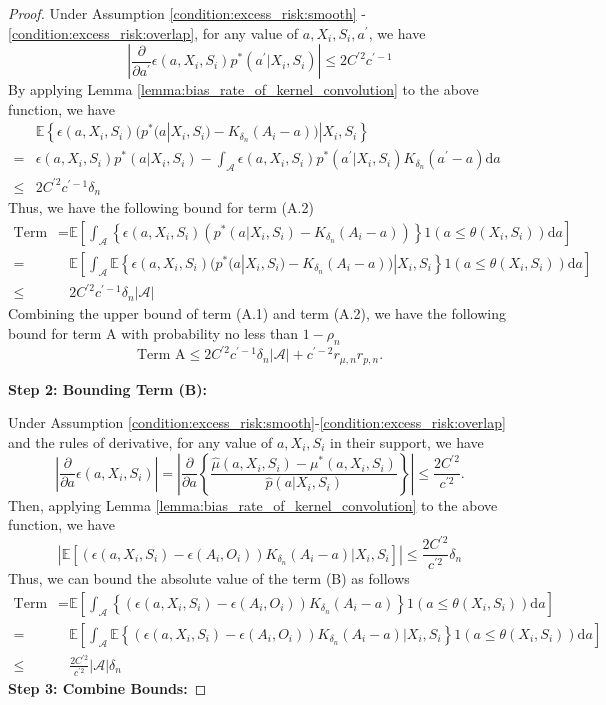 \documentclass[12pt]{article}
\newcommand{\E}{\mathbb{E}}
\begin{document}
\begin{proof}
\noindent Under Assumption \ref{condition:excess_risk:smooth} - \ref{condition:excess_risk:overlap}, for any value of $a,X_i,S_i,a^\prime$, we have 
$$\left|\frac{\partial}{\partial a^\prime}\epsilon(a,X_i,S_i)p^*(a^\prime|X_i,S_i)\right|\leq2C^{\prime2}c^{\prime-1}$$
By applying Lemma \ref{lemma:bias_rate_of_kernel_convolution} to the above function, we have 
\begin{align*}
    &\E\left\{ \epsilon(a,X_i,S_i)(p^*(a|X_i,S_i) - K_{\delta_n}(A_i-a))|X_i,S_i\right\}\\
    = & \epsilon(a,X_i,S_i)p^*(a|X_i,S_i) - \int_\mathcal{A}\epsilon(a,X_i,S_i)p^*(a^\prime|X_i,S_i)K_{\delta_n}(a^\prime - a)\mathrm{d}a\\
    \leq &2C^{\prime2}c^{\prime-1}\delta_n&
\end{align*}
Thus, we have the following bound for term (A.2)
\begin{align*}
    \text{Term (A.2)} = & \E\left[\int_{\mathcal{A}} \left\{ \epsilon(a,X_i,S_i)(p^*(a|X_i,S_i) - K_{\delta_n}(A_i-a))\right\}1(a\leq \theta(X_i,S_i))\mathrm{d}a\right]\\
    = & \E\left[\int_{\mathcal{A}} \E\left\{ \epsilon(a,X_i,S_i)(p^*(a|X_i,S_i) - K_{\delta_n}(A_i-a))|X_i,S_i\right\}1(a\leq \theta(X_i,S_i))\mathrm{d}a\right]\\
    \leq & 2C^{\prime2}c^{\prime-1}\delta_n|\mathcal{A}|
\end{align*}
Combining the upper bound of term (A.1) and term (A.2), we have the following bound for term A with probability no less than $1-\rho_n$
$$\text{Term A}\leq 2C^{\prime2}c^{\prime-1}\delta_n|\mathcal{A}| + c^{\prime-2}r_{\mu,n}r_{p,n}.$$


\noindent\textbf{Step 2: Bounding Term (B):}

\noindent Under Assumption \ref{condition:excess_risk:smooth}-\ref{condition:excess_risk:overlap} and the rules of derivative, for any value of $a,X_i,S_i$ in their support, we have 
$$ \left|\frac{\partial}{\partial a}\epsilon(a,X_i,S_i)\right|= \left|\frac{\partial}{\partial a}\left\{\frac{\widehat\mu(a,X_i,S_i) - \mu^*(a,X_i,S_i)}{\widehat p(a|X_i,S_i)}\right\}\right|\leq \frac{2C^{\prime2}}{c^{\prime2}}.$$
Then, applying Lemma \ref{lemma:bias_rate_of_kernel_convolution} to the above function, we have
$$\left|\E\left[ (\epsilon(a,X_i,S_i) - \epsilon(A_i,O_i)) K_{\delta_n}(A_i-a) \bigg| X_i,S_i\right] \right|\leq \frac{2C^{\prime2}}{c^{\prime2}}{\delta_n}$$
Thus, we can bound the absolute value of the term (B) as follows
\begin{align*}
    \text{Term (B)} =&\E\left[\int_{\mathcal{A}} \left\{(\epsilon(a,X_i,S_i) - \epsilon(A_i,O_i)) K_{\delta_n}(A_i-a)\right\}1(a\leq \theta(X_i,S_i))\mathrm{d}a\right]\\
    = & \E\left[\int_{\mathcal{A}} \E\left\{(\epsilon(a,X_i,S_i) - \epsilon(A_i,O_i)) K_{\delta_n}(A_i-a)|X_i,S_i\right\}1(a\leq \theta(X_i,S_i))\mathrm{d}a\right]\\
    \leq & \frac{2C^{\prime2}}{c^{\prime2}}|\mathcal{A}|{\delta_n}
\end{align*}
\noindent \textbf{Step 3: Combine Bounds:}


\end{proof}
\end{document}
